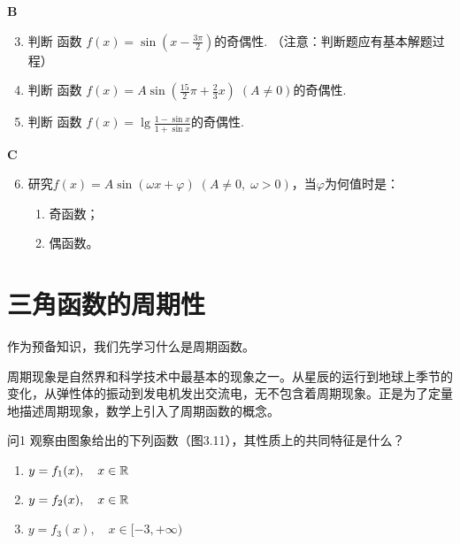 \begin{center}
    \bfseries B
\end{center}
\begin{enumerate}\setcounter{enumi}{2}
    \item 判断 函数 $f(x)=\sin\left(x-\frac{3\pi}{2}\right)$的奇偶性. （注意：判断题应有基本解题过程）
    \item 判断 函数 $f(x)=A\sin\left(\frac{15}{2}\pi+\frac{2}{3}x\right)\; (A\ne 0)$的奇偶性.
    \item 判断 函数 $f(x)=\lg\frac{1-\sin x}{1+\sin x}$的奇偶性.
\end{enumerate}

\begin{center}
    \bfseries C
\end{center}

\begin{enumerate}\setcounter{enumi}{5}
    \item 研究$f(x)=A\sin(\omega x+\varphi)\; (A\ne 0,\; \omega>0)$，当$\varphi$为何值时是：
\begin{multicols}{2}
\begin{enumerate}[(1)]
    \item 奇函数；
    \item 偶函数。
\end{enumerate}    
\end{multicols}
\end{enumerate}

\section{三角函数的周期性}
作为预备知识，我们先学习什么是周期函数。

周期现象是自然界和科学技术中最基本的现象之一。从星辰的运行到地球上季节的变化，从弹性体的振动到发电机发出交流电，无不包含着周期现象。正是为了定量地描述周期现象，数学上引入了周期函数的概念。

\begin{thm}
{问1} 观察由图象给出的下列函数（图3.11），其性质上的共同特征是什么？
\begin{enumerate}[(1)]
    \item $y=f_1(x),\quad x\in\mathbb{R}$
    \item $y=f_2(x),\quad x\in\mathbb{R}$
    \item $y=f_3(x),\quad x\in[-3,+\infty)$
\end{enumerate}
\end{thm}

